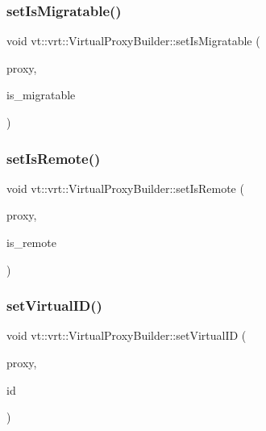 \subsubsection{\texorpdfstring{set\+Is\+Migratable()}{setIsMigratable()}}
{\footnotesize\ttfamily void vt\+::vrt\+::\+Virtual\+Proxy\+Builder\+::set\+Is\+Migratable (\begin{DoxyParamCaption}\item[{\hyperlink{namespacevt_a1b417dd5d684f045bb58a0ede70045ac}{Virtual\+Proxy\+Type} \&}]{proxy,  }\item[{bool const \&}]{is\+\_\+migratable }\end{DoxyParamCaption})\hspace{0.3cm}{\ttfamily [static]}}

\mbox{\label{structvt_1_1vrt_1_1_virtual_proxy_builder_ab9c411d0812ee6854f477f1efed661fb}} 
\subsubsection{\texorpdfstring{set\+Is\+Remote()}{setIsRemote()}}
{\footnotesize\ttfamily void vt\+::vrt\+::\+Virtual\+Proxy\+Builder\+::set\+Is\+Remote (\begin{DoxyParamCaption}\item[{\hyperlink{namespacevt_a1b417dd5d684f045bb58a0ede70045ac}{Virtual\+Proxy\+Type} \&}]{proxy,  }\item[{bool const \&}]{is\+\_\+remote }\end{DoxyParamCaption})\hspace{0.3cm}{\ttfamily [static]}}

\mbox{\label{structvt_1_1vrt_1_1_virtual_proxy_builder_af6ebd54a5d68ae11fa349e71c7b1bbe6}} 
\subsubsection{\texorpdfstring{set\+Virtual\+I\+D()}{setVirtualID()}}
{\footnotesize\ttfamily void vt\+::vrt\+::\+Virtual\+Proxy\+Builder\+::set\+Virtual\+ID (\begin{DoxyParamCaption}\item[{\hyperlink{namespacevt_a1b417dd5d684f045bb58a0ede70045ac}{Virtual\+Proxy\+Type} \&}]{proxy,  }\item[{\hyperlink{namespacevt_1_1vrt_a84d0891f52f70728c3fc2172cffb464b}{Virtual\+I\+D\+Type} const \&}]{id }\end{DoxyParamCaption})\hspace{0.3cm}{\ttfamily [static]}}

